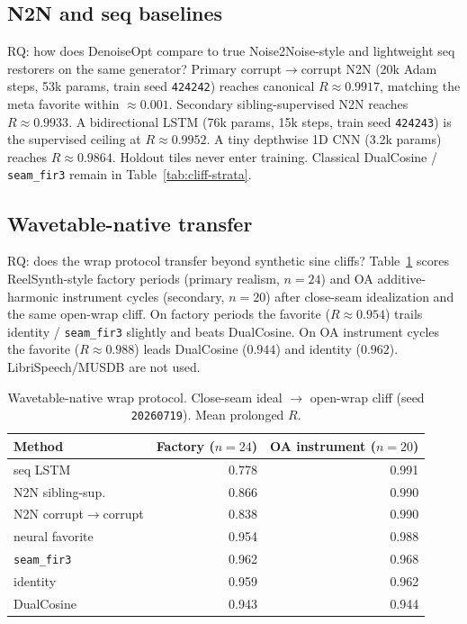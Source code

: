 \subsection{N2N and seq baselines}
\label{sec:n2n-baselines}

RQ: how does DenoiseOpt compare to true Noise2Noise-style and lightweight seq restorers on the same generator?
Primary corrupt$\to$corrupt N2N (20k Adam steps, 53k params, train seed \texttt{424242}) reaches canonical $R\approx 0.9917$, matching the meta favorite within $\approx 0.001$.
Secondary sibling-supervised N2N reaches $R\approx 0.9933$.
A bidirectional LSTM (76k params, 15k steps, train seed \texttt{424243}) is the supervised ceiling at $R\approx 0.9952$.
A tiny depthwise 1D CNN (3.2k params) reaches $R\approx 0.9864$.
Holdout tiles never enter training.
Classical DualCosine / \texttt{seam\_fir3} remain in Table~\ref{tab:cliff-strata}.

\subsection{Wavetable-native transfer}
\label{sec:real-wt}

RQ: does the wrap protocol transfer beyond synthetic sine cliffs?
Table~\ref{tab:real-wt} scores ReelSynth-style factory periods (primary realism, $n{=}24$) and OA additive-harmonic instrument cycles (secondary, $n{=}20$) after close-seam idealization and the same open-wrap cliff.
On factory periods the favorite ($R\approx 0.954$) trails identity / \texttt{seam\_fir3} slightly and beats DualCosine.
On OA instrument cycles the favorite ($R\approx 0.988$) leads DualCosine ($0.944$) and identity ($0.962$).
LibriSpeech/MUSDB are not used.

\begin{table}[t]
  \centering
  \caption{Wavetable-native wrap protocol. Close-seam ideal $\to$ open-wrap cliff (seed \texttt{20260719}). Mean prolonged $R$.}
  \label{tab:real-wt}
  \setlength{\tabcolsep}{3pt}
  \begin{tabular}{@{}lrr@{}}
    \toprule
    Method & Factory ($n{=}24$) & OA instrument ($n{=}20$) \\
    \midrule
    seq LSTM & 0.778 & 0.991 \\
    N2N sibling-sup. & 0.866 & 0.990 \\
    N2N corrupt$\to$corrupt & 0.838 & 0.990 \\
    neural favorite & 0.954 & 0.988 \\
    \texttt{seam\_fir3} & 0.962 & 0.968 \\
    identity & 0.959 & 0.962 \\
    DualCosine & 0.943 & 0.944 \\
    \bottomrule
  \end{tabular}
\end{table}

